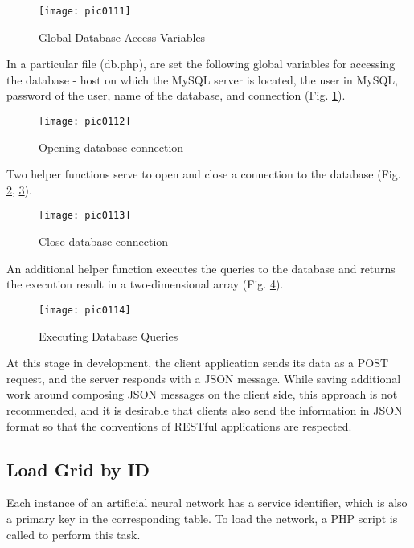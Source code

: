 \begin{figure}[h]
\centering
\texttt{[image: pic0111]}
\caption{Global Database Access Variables}
\label{fig:pic0111}
\end{figure}
\FloatBarrier

In a particular file (db.php), are set the following global variables for accessing the database - host on which the MySQL server is located, the user in MySQL, password of the user, name of the database, and connection (Fig. \ref{fig:pic0111}).

\begin{figure}[h]
\centering
\texttt{[image: pic0112]}
\caption{Opening database connection}
\label{fig:pic0112}
\end{figure}
\FloatBarrier

Two helper functions serve to open and close a connection to the database (Fig. \ref{fig:pic0112}, \ref{fig:pic0113}).

\begin{figure}[h]
\centering
\texttt{[image: pic0113]}
\caption{Close database connection}
\label{fig:pic0113}
\end{figure}
\FloatBarrier

An additional helper function executes the queries to the database and returns the execution result in a two-dimensional array (Fig. \ref{fig:pic0114}).

\begin{figure}[h]
\centering
\texttt{[image: pic0114]}
\caption{Executing Database Queries}
\label{fig:pic0114}
\end{figure}
\FloatBarrier

At this stage in development, the client application sends its data as a POST request, and the server responds with a JSON message. While saving additional work around composing JSON messages on the client side, this approach is not recommended, and it is desirable that clients also send the information in JSON format so that the conventions of RESTful applications are respected.

\subsection{Load Grid by ID}

Each instance of an artificial neural network has a service identifier, which is also a primary key in the corresponding table. To load the network, a PHP script is called to perform this task.

